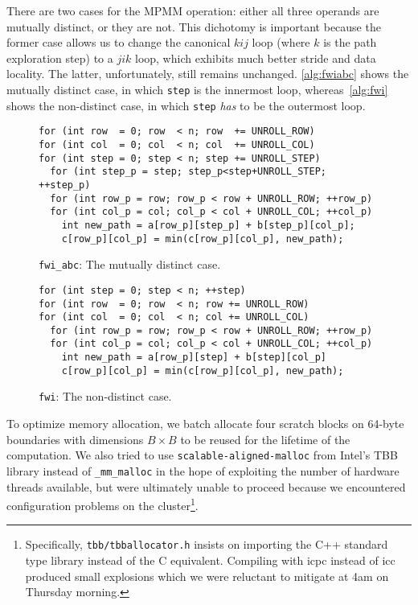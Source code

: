\documentclass{scrartcl}
\begin{document}
  There are two cases for the MPMM operation: either all three operands are mutually distinct, or they are not. This dichotomy is important because the former case allows us to change the canonical $kij$ loop (where $k$ is the path exploration step) to a $jik$ loop, which exhibits much better stride and data locality. The latter, unfortunately, still remains unchanged. \autoref{alg:fwiabc} shows the mutually distinct case, in which \texttt{step} is the innermost loop, whereas~\autoref{alg:fwi} shows the non-distinct case, in which \texttt{step} \emph{has} to be the outermost loop.

  \begin{figure}[ht!]
    \begin{lstlisting}
for (int row  = 0; row  < n; row  += UNROLL_ROW)
for (int col  = 0; col  < n; col  += UNROLL_COL)
for (int step = 0; step < n; step += UNROLL_STEP)
  for (int step_p = step; step_p<step+UNROLL_STEP; ++step_p)
  for (int row_p = row; row_p < row + UNROLL_ROW; ++row_p)
  for (int col_p = col; col_p < col + UNROLL_COL; ++col_p)
    int new_path = a[row_p][step_p] + b[step_p][col_p];
    c[row_p][col_p] = min(c[row_p][col_p], new_path);
    \end{lstlisting}
    \cprotect\caption{\texttt{fwi\_abc}: The mutually distinct case.\label{alg:fwiabc}}
  \end{figure}

  \begin{figure}[ht!]
    \begin{lstlisting}
for (int step = 0; step < n; ++step)
for (int row  = 0; row  < n; row += UNROLL_ROW)
for (int col  = 0; col  < n; col += UNROLL_COL)
  for (int row_p = row; row_p < row + UNROLL_ROW; ++row_p)
  for (int col_p = col; col_p < col + UNROLL_COL; ++col_p)
    int new_path = a[row_p][step] + b[step][col_p]
    c[row_p][col_p] = min(c[row_p][col_p], new_path);
    \end{lstlisting}
    \cprotect\caption{\texttt{fwi}: The non-distinct case.\label{alg:fwi}}
  \end{figure}

  To optimize memory allocation, we batch allocate four scratch blocks on 64-byte boundaries with dimensions $B \times B$ to be reused for the lifetime of the computation. We also tried to use \texttt{scalable-aligned-malloc} from Intel's TBB library instead of \texttt{\_mm\_malloc} in the hope of exploiting the number of hardware threads available, but were ultimately unable to proceed because we encountered configuration problems on the cluster\footnote{Specifically, \texttt{tbb/tbballocator.h} insists on importing the C++ standard type library instead of the C equivalent. Compiling with icpc instead of icc produced small explosions which we were reluctant to mitigate at 4am on Thursday morning.}.
\end{document}
